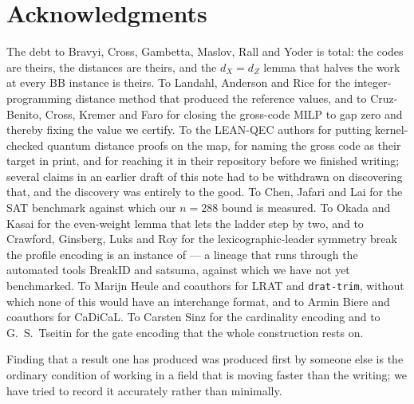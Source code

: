 \documentclass[11pt]{amsart}
\newcommand{\dX}{d_{X}}
\newcommand{\dZ}{d_{Z}}
\theoremstyle{plain}
\theoremstyle{definition}
\theoremstyle{remark}
\begin{document}
\section*{Acknowledgments}

The debt to Bravyi, Cross, Gambetta, Maslov, Rall and Yoder is total: the codes
are theirs, the distances are theirs, and the $\dX=\dZ$ lemma that halves the
work at every BB instance is theirs. To Landahl, Anderson and Rice for the
integer-programming distance method that produced the reference values, and to
Cruz-Benito, Cross, Kremer and Faro for closing the gross-code MILP to gap
zero and thereby fixing the value we certify. To the
LEAN-QEC authors for putting kernel-checked quantum distance proofs on the map,
for naming the gross code as their target in print, and for reaching it in
their repository before we finished writing; several claims in an earlier draft
of this note had to be withdrawn on discovering that, and the discovery was
entirely to the good. To Chen, Jafari and Lai for the SAT benchmark against
which our $n=288$ bound is measured. To Okada and Kasai for the even-weight
lemma that lets the ladder step by two, and to Crawford, Ginsberg, Luks and Roy
for the lexicographic-leader symmetry break the profile encoding is an instance
of --- a lineage that runs through the automated tools BreakID and satsuma,
against which we have not yet benchmarked. To Marijn Heule and coauthors for
LRAT and
\texttt{drat-trim}, without which none of this would have an interchange
format, and to Armin Biere and coauthors for CaDiCaL. To Carsten Sinz for the
cardinality encoding and to G.~S.~Tseitin for the gate encoding that the whole
construction rests on.

Finding that a result one has produced was produced first by someone else is
the ordinary condition of working in a field that is moving faster than the
writing; we have tried to record it accurately rather than minimally.
\end{document}
